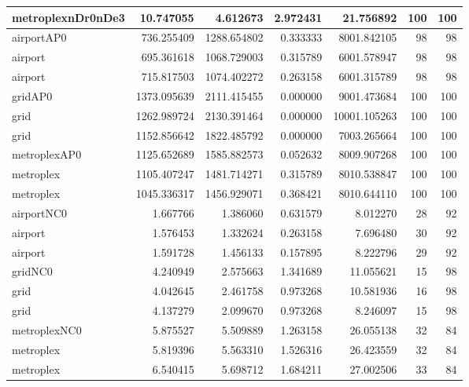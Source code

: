\begin{longtable}{|l|r|r|r|r|r|r|}
metroplexnDr0nDe3 & 10.747055 & 4.612673 & 2.972431 & 21.756892 & 100 & 100 \\ \hline
airportAP0 & 736.255409 & 1288.654802 & 0.333333 & 8001.842105 & 98 & 98 \\ \hline
airport & 695.361618 & 1068.729003 & 0.315789 & 6001.578947 & 98 & 98 \\ \hline
airport & 715.817503 & 1074.402272 & 0.263158 & 6001.315789 & 98 & 98 \\ \hline
gridAP0 & 1373.095639 & 2111.415455 & 0.000000 & 9001.473684 & 100 & 100 \\ \hline
grid & 1262.989724 & 2130.391464 & 0.000000 & 10001.105263 & 100 & 100 \\ \hline
grid & 1152.856642 & 1822.485792 & 0.000000 & 7003.265664 & 100 & 100 \\ \hline
metroplexAP0 & 1125.652689 & 1585.882573 & 0.052632 & 8009.907268 & 100 & 100 \\ \hline
metroplex & 1105.407247 & 1481.714271 & 0.315789 & 8010.538847 & 100 & 100 \\ \hline
metroplex & 1045.336317 & 1456.929071 & 0.368421 & 8010.644110 & 100 & 100 \\ \hline
airportNC0 & 1.667766 & 1.386060 & 0.631579 & 8.012270 & 28 & 92 \\ \hline
airport & 1.576453 & 1.332624 & 0.263158 & 7.696480 & 30 & 92 \\ \hline
airport & 1.591728 & 1.456133 & 0.157895 & 8.222796 & 29 & 92 \\ \hline
gridNC0 & 4.240949 & 2.575663 & 1.341689 & 11.055621 & 15 & 98 \\ \hline
grid & 4.042645 & 2.461758 & 0.973268 & 10.581936 & 16 & 98 \\ \hline
grid & 4.137279 & 2.099670 & 0.973268 & 8.246097 & 15 & 98 \\ \hline
metroplexNC0 & 5.875527 & 5.509889 & 1.263158 & 26.055138 & 32 & 84 \\ \hline
metroplex & 5.819396 & 5.563310 & 1.526316 & 26.423559 & 32 & 84 \\ \hline
metroplex & 6.540415 & 5.698712 & 1.684211 & 27.002506 & 33 & 84 \\ \hline
\end{longtable}
